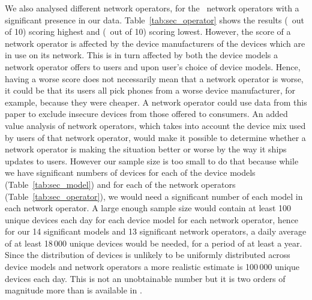 \daTabSecScoresoperator
We also analysed different network operators, for the \daNumSigOperators\ network operators with a significant presence in our data.
Table~\ref{tab:sec_operator} shows the results \emph{\daSecScoreBestoperator} (\daSecScoreBestoperatorScore\ out of 10) scoring highest and \emph{\daSecScoreWorstoperator} (\daSecScoreWorstoperatorScore\ out of 10) scoring lowest.
However, the score of a network operator is affected by the device manufacturers of the devices which are in use on its network.
This is in turn affected by both the device models a network operator offers to users and upon user's choice of device models.
Hence, having a worse score does not necessarily mean that a network operator is worse, it could be that its users all pick phones from a worse device manufacturer, for example, because they were cheaper.
A network operator could use data from this paper to exclude insecure devices from those offered to consumers.
An added value analysis of network operators, which takes into account the device mix used by users of that network operator, would make it possible to determine whether a network operator is making the situation better or worse by the way it ships updates to users.
However our sample size is too small to do that because while we have significant numbers of devices for each of the device models (Table~\ref{tab:sec_model}) and for each of the network operators (Table~\ref{tab:sec_operator}), we would need a significant number of each model in each network operator.
A large enough sample size would contain at least 100 unique devices each day for each device model for each network operator, hence for our 14 significant models and 13 significant network operators, a daily average of at least 18\,000 unique devices would be needed, for a period of at least a year.
Since the distribution of devices is unlikely to be uniformly distributed across device models and network operators a more realistic estimate is 100\,000 unique devices each day.
This is not an unobtainable number but it is two orders of magnitude more than is available in \da.


